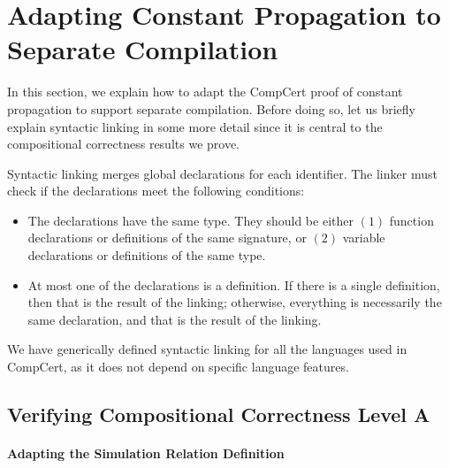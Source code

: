 \section{Adapting Constant Propagation to Separate Compilation}
\label{sec:sepcomp:constprop}


In this section, we explain how to adapt the CompCert proof of
constant propagation to support separate compilation.  Before doing
so, let us briefly explain syntactic linking in some more detail since
it is central to the compositional correctness results we prove.

Syntactic linking merges global declarations for each identifier.
The linker must check if the declarations meet the following conditions:
\begin{itemize}
\item The declarations have the same type.  They should be either
  $(1)$ function declarations or definitions of the same signature, or
  $(2)$ variable declarations or definitions of the same type.
\item At most one of the declarations is a definition.  If there is a
  single definition, then that is the result of the linking;
  otherwise, everything is necessarily the same declaration, and that
  is the result of the linking.
\end{itemize}
\noindent We have generically defined syntactic linking for all the
languages used in CompCert, as it does not depend on specific language
features.


\subsection{Verifying Compositional Correctness Level A}

\paragraph{Adapting the Simulation Relation Definition}

